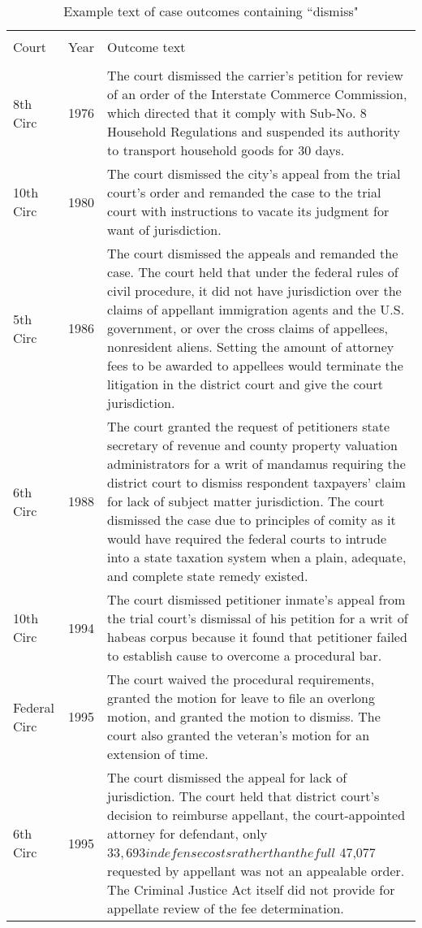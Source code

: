 \documentclass[10pt, letterpaper]{article}
\begin{document}
\begin{spacing}{1.0}
\begin{small}
\begin{longtable}[H]{llp{5in}}
    \caption{Example text of case outcomes containing ``dismiss"}\\
    \hline\\[-6pt]
    Court & Year & Outcome text\\[2pt]
    \hline\\[-6pt]
    \endhead
    8th Circ & 1976 & The court dismissed the carrier's petition for review of an order of the Interstate Commerce Commission, which directed that it comply with Sub-No. 8 Household Regulations and suspended its authority to transport household goods for 30 days.\\[4pt]
    10th Circ & 1980 & The court dismissed the city's appeal from the trial court's order and remanded the case to the trial court with instructions to vacate its judgment for want of jurisdiction.\\[4pt]
    5th Circ & 1986 & The court dismissed the appeals and remanded the case. The court held that under the federal rules of civil procedure, it did not have jurisdiction over the claims of appellant immigration agents and the U.S. government, or over the cross claims of appellees, nonresident aliens. Setting the amount of attorney fees to be awarded to appellees would terminate the litigation in the district court and give the court jurisdiction.\\[4pt]
    6th Circ & 1988 & The court granted the request of petitioners state secretary of revenue and county property valuation administrators for a writ of mandamus requiring the district court to dismiss respondent taxpayers' claim for lack of subject matter jurisdiction. The court dismissed the case due to principles of comity as it would have required the federal courts to intrude into a state taxation system when a plain, adequate, and complete state remedy existed.\\[4pt]
    10th Circ & 1994 & The court dismissed petitioner inmate's appeal from the trial court's dismissal of his petition for a writ of habeas corpus because it found that petitioner failed to establish cause to overcome a procedural bar.\\[4pt]
    Federal Circ & 1995 & The court waived the procedural requirements, granted the motion for leave to file an overlong motion, and granted the motion to dismiss. The court also granted the veteran's motion for an extension of time.\\[4pt]
    6th Circ & 1995 & The court dismissed the appeal for lack of jurisdiction. The court held that district court's decision to reimburse appellant, the court-appointed attorney for defendant, only $ 33,693 in defense costs rather than the full $ 47,077 requested by appellant was not an appealable order. The Criminal Justice Act itself did not provide for appellate review of the fee determination.\\[4pt]

\end{longtable}
\end{small}
\end{spacing}
\end{document}
